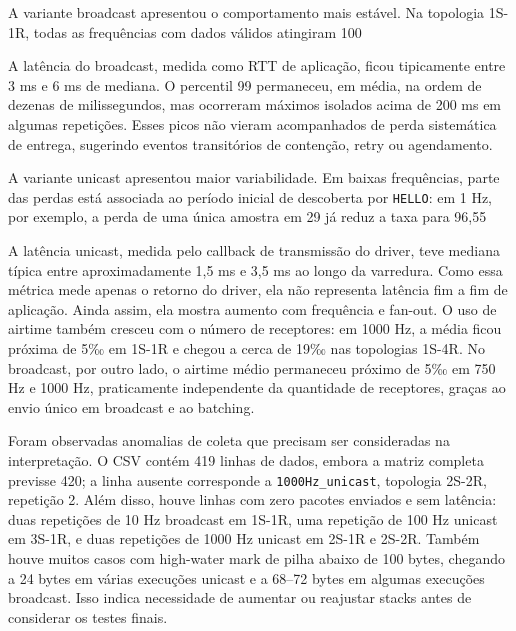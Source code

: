 \documentclass{article}
\begin{document}
    A variante broadcast apresentou o comportamento mais estável. Na topologia 1S-1R, todas as frequências com dados válidos atingiram 100%

    A latência do broadcast, medida como RTT de aplicação, ficou tipicamente entre 3 ms e 6 ms de mediana. O percentil 99 permaneceu, em média, na ordem de dezenas de milissegundos, mas ocorreram máximos isolados acima de 200 ms em algumas repetições. Esses picos não vieram acompanhados de perda sistemática de entrega, sugerindo eventos transitórios de contenção, retry ou agendamento.

    A variante unicast apresentou maior variabilidade. Em baixas frequências, parte das perdas está associada ao período inicial de descoberta por \texttt{HELLO}: em 1 Hz, por exemplo, a perda de uma única amostra em 29 já reduz a taxa para 96,55%

    A latência unicast, medida pelo callback de transmissão do driver, teve mediana típica entre aproximadamente 1,5 ms e 3,5 ms ao longo da varredura. Como essa métrica mede apenas o retorno do driver, ela não representa latência fim a fim de aplicação. Ainda assim, ela mostra aumento com frequência e fan-out. O uso de airtime também cresceu com o número de receptores: em 1000 Hz, a média ficou próxima de 5‰ em 1S-1R e chegou a cerca de 19‰ nas topologias 1S-4R. No broadcast, por outro lado, o airtime médio permaneceu próximo de 5‰ em 750 Hz e 1000 Hz, praticamente independente da quantidade de receptores, graças ao envio único em broadcast e ao batching.

    Foram observadas anomalias de coleta que precisam ser consideradas na interpretação. O CSV contém 419 linhas de dados, embora a matriz completa previsse 420; a linha ausente corresponde a \texttt{1000Hz_unicast}, topologia 2S-2R, repetição 2. Além disso, houve linhas com zero pacotes enviados e sem latência: duas repetições de 10 Hz broadcast em 1S-1R, uma repetição de 100 Hz unicast em 3S-1R, e duas repetições de 1000 Hz unicast em 2S-1R e 2S-2R. Também houve muitos casos com high-water mark de pilha abaixo de 100 bytes, chegando a 24 bytes em várias execuções unicast e a 68--72 bytes em algumas execuções broadcast. Isso indica necessidade de aumentar ou reajustar stacks antes de considerar os testes finais.
\end{document}

